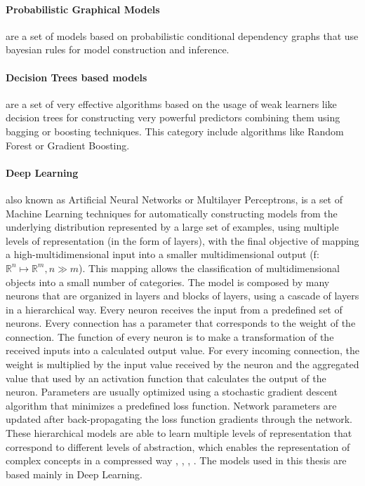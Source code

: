 \paragraph{Probabilistic Graphical Models} are a set of models based on probabilistic conditional dependency graphs that use bayesian rules for model construction and inference.

\paragraph{Decision Trees based models} are a set of very effective algorithms based on the usage of weak learners like decision trees for constructing very powerful predictors combining them using bagging or boosting techniques. This category include algorithms like Random Forest or Gradient Boosting.

\paragraph{Deep Learning} also known as Artificial Neural Networks or Multilayer Perceptrons, is a set of Machine Learning techniques for automatically constructing models from the underlying distribution represented by a large set of examples, using multiple levels of representation (in the form of layers), with the final objective of mapping a high-multidimensional input into a smaller multidimensional output (f: $\mathbb{R}^{n} \mapsto \mathbb{R}^{m}, n \gg m$). This mapping allows the classification of multidimensional objects into a small number of categories. The model is composed by many neurons that are organized in layers and blocks of layers, using a cascade of layers in a hierarchical way. Every neuron receives the input from a predefined set of neurons. Every connection has a parameter that corresponds to the weight of the connection. The function of every neuron is to make a transformation of the received inputs into a calculated output value. For every incoming connection, the weight is multiplied by the input value received by the neuron and the aggregated value that used by an activation function that calculates the output of the neuron. Parameters are usually optimized using a stochastic gradient descent algorithm that minimizes a predefined loss function. Network parameters are updated after back-propagating the loss function gradients through the network. These hierarchical models are able to learn multiple levels of representation that correspond to different levels of abstraction, which enables the representation of complex concepts in a compressed way \citep{nature-deep-learning}, \citep{888}, \citep{Bengio:2013:RLR:2498740.2498889}, \citep{bengio-2009}. The models used in this thesis are based mainly in Deep Learning.

